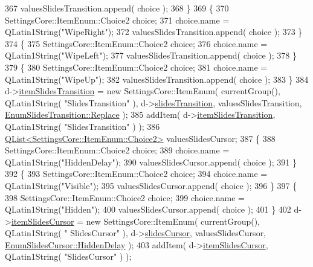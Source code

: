 \begin{DoxyCode}
367     valuesSlidesTransition.append( choice );
368   \}
369   \{
370     SettingsCore::ItemEnum::Choice2 choice;
371     choice.name = QLatin1String(\textcolor{stringliteral}{"WipeRight"});
372     valuesSlidesTransition.append( choice );
373   \}
374   \{
375     SettingsCore::ItemEnum::Choice2 choice;
376     choice.name = QLatin1String(\textcolor{stringliteral}{"WipeLeft"});
377     valuesSlidesTransition.append( choice );
378   \}
379   \{
380     SettingsCore::ItemEnum::Choice2 choice;
381     choice.name = QLatin1String(\textcolor{stringliteral}{"WipeUp"});
382     valuesSlidesTransition.append( choice );
383   \}
384   d->\hyperlink{classOkular_1_1SettingsPrivate_a8bffe2ed1e53f170465d9061dc123361}{itemSlidesTransition} = \textcolor{keyword}{new} SettingsCore::ItemEnum( currentGroup(), QLatin1String( \textcolor{stringliteral}{
      "SlidesTransition"} ), d->\hyperlink{classOkular_1_1SettingsPrivate_a0332fa4a91512006b7c4ddcc4e979b37}{slidesTransition}, valuesSlidesTransition, 
      \hyperlink{classOkular_1_1Settings_1_1EnumSlidesTransition_ae1bec274595e6aac4cdcfc809afb3d63a3cb2b7a46abd95b4426a08787155d9c9}{EnumSlidesTransition::Replace} );
385   addItem( d->\hyperlink{classOkular_1_1SettingsPrivate_a8bffe2ed1e53f170465d9061dc123361}{itemSlidesTransition}, QLatin1String( \textcolor{stringliteral}{"SlidesTransition"} ) );
386   \hyperlink{classQList}{QList<SettingsCore::ItemEnum::Choice2>} valuesSlidesCursor;
387   \{
388     SettingsCore::ItemEnum::Choice2 choice;
389     choice.name = QLatin1String(\textcolor{stringliteral}{"HiddenDelay"});
390     valuesSlidesCursor.append( choice );
391   \}
392   \{
393     SettingsCore::ItemEnum::Choice2 choice;
394     choice.name = QLatin1String(\textcolor{stringliteral}{"Visible"});
395     valuesSlidesCursor.append( choice );
396   \}
397   \{
398     SettingsCore::ItemEnum::Choice2 choice;
399     choice.name = QLatin1String(\textcolor{stringliteral}{"Hidden"});
400     valuesSlidesCursor.append( choice );
401   \}
402   d->\hyperlink{classOkular_1_1SettingsPrivate_ad81b5a683ded63607aea2c7f64cab5d6}{itemSlidesCursor} = \textcolor{keyword}{new} SettingsCore::ItemEnum( currentGroup(), QLatin1String( \textcolor{stringliteral}{"
      SlidesCursor"} ), d->\hyperlink{classOkular_1_1SettingsPrivate_ad929dff4ddff7595b0f4c50bdbd4c091}{slidesCursor}, valuesSlidesCursor, 
      \hyperlink{classOkular_1_1Settings_1_1EnumSlidesCursor_a1e2cb729c98ff2274a74500aa64abbc4ad3624e5ed1cac74d2009cd6a67491ab6}{EnumSlidesCursor::HiddenDelay} );
403   addItem( d->\hyperlink{classOkular_1_1SettingsPrivate_ad81b5a683ded63607aea2c7f64cab5d6}{itemSlidesCursor}, QLatin1String( \textcolor{stringliteral}{"SlidesCursor"} ) );

\end{DoxyCode}
